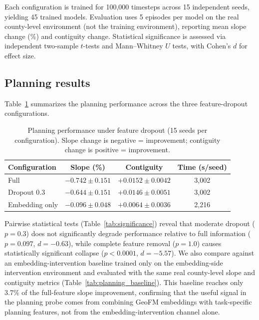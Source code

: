 \documentclass{article}
\begin{document}
Each configuration is trained for 100{,}000 timesteps across 15 independent seeds, yielding 45 trained models. Evaluation uses 5 episodes per model on the real county-level environment (not the training environment), reporting mean slope change (\%) and contiguity change. Statistical significance is assessed via independent two-sample $t$-tests and Mann--Whitney $U$ tests, with Cohen's $d$ for effect size.

\subsection{Planning results}

Table~\ref{tab:dropout} summarizes the planning performance across the three feature-dropout configurations.

\begin{table}[htbp]
\centering
\caption{Planning performance under feature dropout (15 seeds per configuration). Slope change is negative = improvement; contiguity change is positive = improvement.}
\label{tab:dropout}
\footnotesize
\begin{tabular*}{\textwidth}{@{\extracolsep{\fill}}lccc@{}}
\toprule
Configuration & Slope (\%) & Contiguity & Time (s/seed) \\
\midrule
Full & $-0.742 \pm 0.151$ & $+0.0152 \pm 0.0042$ & 3{,}002 \\
Dropout 0.3 & $-0.644 \pm 0.151$ & $+0.0146 \pm 0.0051$ & 3{,}002 \\
Embedding only & $-0.096 \pm 0.048$ & $+0.0064 \pm 0.0036$ & 2{,}216 \\
\bottomrule
\end{tabular*}
\end{table}

Pairwise statistical tests (Table~\ref{tab:significance}) reveal that moderate dropout ($p=0.3$) does not significantly degrade performance relative to full information ($p = 0.097$, $d = -0.63$), while complete feature removal ($p=1.0$) causes statistically significant collapse ($p < 0.0001$, $d = -5.57$). We also compare against an embedding-intervention baseline trained only on the embedding-side intervention environment and evaluated with the same real county-level slope and contiguity metrics (Table~\ref{tab:planning_baseline}). This baseline reaches only 3.7\% of the full-feature slope improvement, confirming that the useful signal in the planning probe comes from combining GeoFM embeddings with task-specific planning features, not from the embedding-intervention channel alone.
\end{document}
